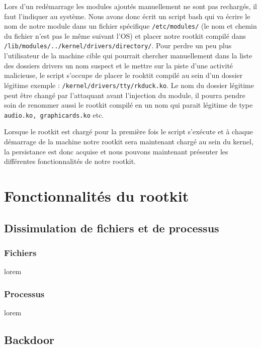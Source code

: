 \documentclass[11pt]{article}
\begin{document}
    Lors d'un redémarrage les modules ajoutés manuellement ne sont pas rechargés, il faut l'indiquer au système. Nous avons donc écrit un script bash qui va écrire le nom de notre module dans un fichier spécifique \texttt{/etc/modules/} (le nom et chemin du fichier n'est pas le même suivant l'OS) et placer notre rootkit compilé dans \texttt{/lib/modules/../kernel/drivers/directory/}. Pour perdre un peu plus l'utilisateur de la machine cible qui pourrait chercher manuellement dans la liste des dossiers drivers un nom suspect et le mettre sur la piste d'une activité malicieuse, le script s'occupe de placer le rooktit compilé au sein d'un dossier légitime exemple : \texttt{/kernel/drivers/tty/rkduck.ko}. Le nom du dossier légitime peut être changé par l'attaquant avant l'injection du module, il pourra pendre soin de renommer aussi le rootkit compilé en un nom qui parait légitime de type \texttt{audio.ko, graphicards.ko} etc.
    
    Lorsque le rootkit est chargé pour la première fois le script s'exécute et à chaque démarrage de la machine notre rootkit sera maintenant chargé au sein du kernel, la persistance est donc acquise et nous pouvons maintenant présenter les différentes fonctionnalités de notre rootkit.

    
\section{Fonctionnalités du rootkit}
    
    \subsection{Dissimulation de fichiers et de processus}
    
        \subsubsection{Fichiers}
            lorem
        \subsubsection{Processus}
            lorem
            
    \subsection{Backdoor}
    
\end{document}
